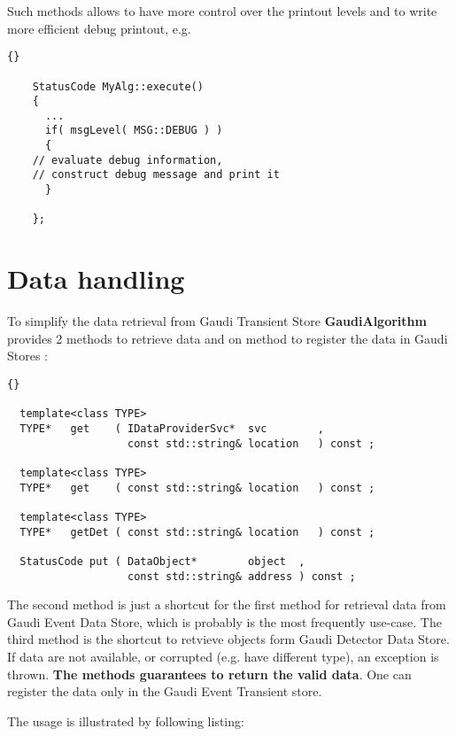 \documentclass{lhcbnote}
\newcommand{\bftt}         {\ttfamily\bfseries}
\begin{document}
Such methods allows to have more control
over the printout levels and to write more efficient debug printout, e.g.

\begin{scriptsize}
 \begin{lstlisting}{}

    StatusCode MyAlg::execute()
    {
      ...
      if( msgLevel( MSG::DEBUG ) )
      {
	// evaluate debug information,
	// construct debug message and print it
      }

    };

 \end{lstlisting}
\end{scriptsize}


\section{Data handling}

To simplify the data retrieval from Gaudi Transient Store
{\bftt{GaudiAlgorithm}} provides 2 methods to retrieve
data and on method to register the data in Gaudi Stores :

\begin{scriptsize}
 \begin{lstlisting}{}

  template<class TYPE>
  TYPE*   get    ( IDataProviderSvc*  svc        ,
                   const std::string& location   ) const ;

  template<class TYPE>
  TYPE*   get    ( const std::string& location   ) const ;

  template<class TYPE>
  TYPE*   getDet ( const std::string& location   ) const ;

  StatusCode put ( DataObject*        object  ,
                   const std::string& address ) const ;

 \end{lstlisting}
\end{scriptsize}

The second method is just a shortcut for the first
method for retrieval data from Gaudi Event Data Store,
which is probably is the most frequently use-case.
The third method is the shortcut to retvieve objects form
Gaudi Detector Data Store.
If data are not available, or corrupted (e.g. have different type),
an exception is thrown. {\bf{The methods guarantees to
    return the valid data}}. One can register the data
only in the Gaudi Event Transient store.

The usage is illustrated by following listing:
\end{document}
